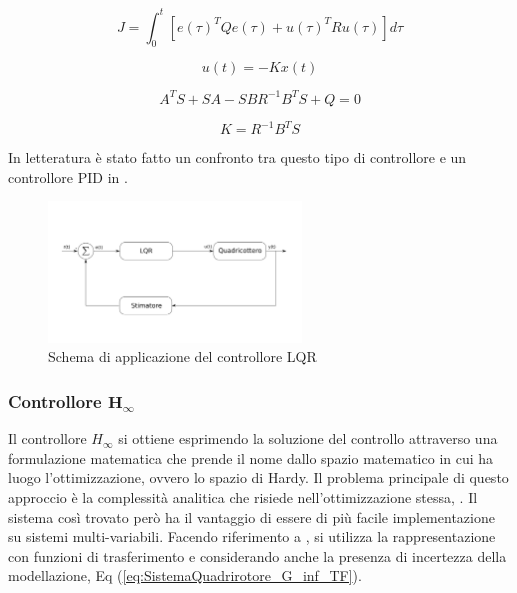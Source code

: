 \begin{equation}\label{eq:SistemaQuadrirotore_LQRCosto}
	J = \int_{0}^{t} \left[e(\tau)^T Q e(\tau) + u(\tau)^T R u(\tau)\right] d \tau
\end{equation}

\begin{equation}\label{eq:SistemaQuadrirotore_K_LQR}
	u(t) = -K x(t)
\end{equation}

\begin{equation}\label{eq:SistemaQuadrirotore_Ricatti}
	A^T S + S A - S B R^{-1} B^T S + Q = 0
\end{equation}

\begin{equation}\label{eq:SistemaQuadrirotore_Ricatti_sol}
	K = R^{-1} B^T S
\end{equation}

In letteratura è stato fatto un confronto tra questo tipo di controllore e un controllore PID in \cite{PID_vs_LQ}.

\begin{figure}
	\centering
	\includegraphics[width=0.6\textwidth]{SistemaQuadrirotore/Figure/LQR}
	\caption{Schema di applicazione del controllore LQR}
\end{figure}
 

\subsubsection{Controllore $\mathbf{H_\infty}$}

Il controllore $H_\infty$ si ottiene esprimendo la soluzione del controllo attraverso una formulazione matematica che prende il nome dallo spazio matematico in cui ha luogo l'ottimizzazione, ovvero lo spazio di Hardy. Il problema principale di questo approccio è la complessità analitica che risiede nell'ottimizzazione stessa, \cite{GrimbleM.J1991Hrcd}. Il sistema così trovato però ha il vantaggio di essere di più facile implementazione su sistemi multi-variabili. Facendo riferimento a \cite{GrimbleM.J1991Hrcd}, si utilizza la rappresentazione con funzioni di trasferimento e considerando anche la presenza di incertezza della modellazione, Eq (\ref{eq:SistemaQuadrirotore_G_inf_TF}).

